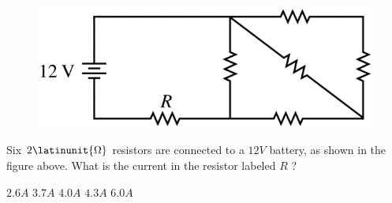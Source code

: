 \begin{figure}[H]
\centering
\includegraphics[scale=0.3]{images/img-008-014.png}
\end{figure}

\begin{questions}\setcounter{question}{14}\question
Six $2 \latinunit{\Omega}$ resistors are connected to a $12 \unit{V}$ battery, as shown in the figure above. What is the current in the resistor labeled $R$ ?

\begin{oneparchoices}
\choice $2.6 \unit{A}$
\choice $3.7 \unit{A}$
\choice $4.0 \unit{A}$
\choice $4.3 \unit{A}$
\choice $6.0 \unit{A}$
\end{oneparchoices}\end{questions}
